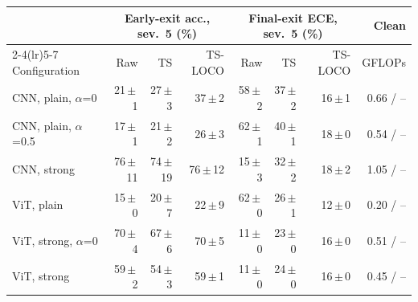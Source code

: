 \begin{tabular}{lrrrrrrr}
\toprule
 & \multicolumn{3}{c}{Early-exit acc., sev.\ 5 (\%)} & \multicolumn{3}{c}{Final-exit ECE, sev.\ 5 (\%)} & Clean \\
\cmidrule(lr){2-4}\cmidrule(lr){5-7}
Configuration & Raw & TS & TS-LOCO & Raw & TS & TS-LOCO & GFLOPs \\
\midrule
CNN, plain, $\alpha$=0 & 21\,$\pm$\,1 & 27\,$\pm$\,3 & 37\,$\pm$\,2 & 58\,$\pm$\,2 & 37\,$\pm$\,2 & 16\,$\pm$\,1 & 0.66 / -- \\
CNN, plain, $\alpha$=0.5 & 17\,$\pm$\,1 & 21\,$\pm$\,2 & 26\,$\pm$\,3 & 62\,$\pm$\,1 & 40\,$\pm$\,1 & 18\,$\pm$\,0 & 0.54 / -- \\
CNN, strong & 76\,$\pm$\,11 & 74\,$\pm$\,19 & 76\,$\pm$\,12 & 15\,$\pm$\,3 & 32\,$\pm$\,2 & 18\,$\pm$\,2 & 1.05 / -- \\
ViT, plain & 15\,$\pm$\,0 & 20\,$\pm$\,7 & 22\,$\pm$\,9 & 62\,$\pm$\,0 & 26\,$\pm$\,1 & 12\,$\pm$\,0 & 0.20 / -- \\
ViT, strong, $\alpha$=0 & 70\,$\pm$\,4 & 67\,$\pm$\,6 & 70\,$\pm$\,5 & 11\,$\pm$\,0 & 23\,$\pm$\,0 & 16\,$\pm$\,0 & 0.51 / -- \\
ViT, strong & 59\,$\pm$\,2 & 54\,$\pm$\,3 & 59\,$\pm$\,1 & 11\,$\pm$\,0 & 24\,$\pm$\,0 & 16\,$\pm$\,0 & 0.45 / -- \\
\bottomrule
\end{tabular}

